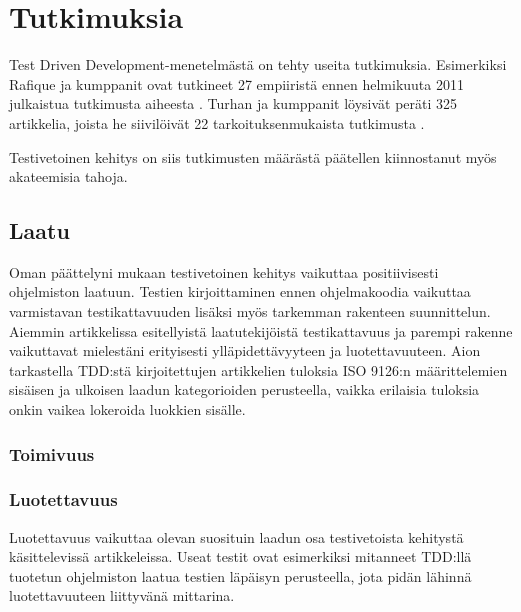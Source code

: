 \documentclass[finnish]{tktltiki2}
\theoremstyle{definition}
\theoremstyle{remark}
\begin{document}
 







\section{Tutkimuksia}

Test Driven Development-menetelmästä on tehty useita tutkimuksia. Esimerkiksi Rafique ja kumppanit ovat tutkineet 27 empiiristä ennen helmikuuta 2011 julkaistua tutkimusta aiheesta \cite{Rafique13}. Turhan ja kumppanit löysivät peräti 325 artikkelia, joista he siivilöivät 22 tarkoituksenmukaista tutkimusta \cite{Turhan10}. 

Testivetoinen kehitys on siis tutkimusten määrästä päätellen kiinnostanut myös akateemisia tahoja.




\subsection{Laatu}

Oman päättelyni mukaan testivetoinen kehitys vaikuttaa positiivisesti ohjelmiston laatuun. Testien kirjoittaminen ennen ohjelmakoodia vaikuttaa varmistavan testikattavuuden lisäksi myös tarkemman rakenteen suunnittelun. Aiemmin artikkelissa esitellyistä laatutekijöistä testikattavuus ja parempi rakenne vaikuttavat mielestäni erityisesti ylläpidettävyyteen ja luotettavuuteen. Aion tarkastella TDD:stä kirjoitettujen artikkelien tuloksia ISO 9126:n määrittelemien sisäisen ja ulkoisen laadun kategorioiden perusteella, vaikka erilaisia tuloksia onkin vaikea lokeroida luokkien sisälle.

\subsubsection{Toimivuus}

\subsubsection{Luotettavuus}

Luotettavuus vaikuttaa olevan suosituin laadun osa testivetoista kehitystä käsittelevissä artikkeleissa. Useat testit ovat esimerkiksi mitanneet TDD:llä tuotetun ohjelmiston laatua testien läpäisyn perusteella, jota pidän lähinnä luotettavuuteen liittyvänä mittarina.
\end{document}
